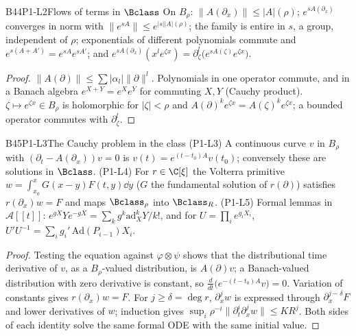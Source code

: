 \begin{dimcard}{B44}{P1-L2}{Flows of terms in $\Bclass$}{\proved}{}
On $B_\rho$: $\|A(\partial_x)\|\le|A|(\rho)$; $e^{sA(\partial_x)}$ converges in norm with $\|e^{sA}\|\le e^{|s||A|(\rho)}$; the family is entire in $s$, a group, independent of $\rho$; exponentials of different polynomials commute and $e^{s(A+A')}=e^{sA}e^{sA'}$; and $e^{sA(\partial_x)}(x^le^{\zeta x})=\partial_\zeta^l\big(e^{sA(\zeta)}e^{\zeta x}\big)$.
\end{dimcard}
\begin{proof}
$\|A(\partial)\|\le\sum|\alpha_l|\|\partial\|^l$. Polynomials in one operator commute, and in a Banach algebra $e^{X+Y}=e^Xe^Y$ for commuting $X,Y$ (Cauchy product).
$\zeta\mapsto e^{\zeta x}\in B_\rho$ is holomorphic for $|\zeta|<\rho$ and $A(\partial)^ke^{\zeta x}=A(\zeta)^ke^{\zeta x}$; a bounded operator commutes with $\partial_\zeta^l$.
\end{proof}

\begin{dimcard}{B45}{P1-L3}{The Cauchy problem in the class}{\proved}{}
\label{dim:P1-L4}\label{dim:P1-L5}%
(P1-L3) A continuous curve $v$ in $B_\rho$ with $(\partial_t-A(\partial_x))v=0$ is $v(t)=e^{(t-t_0)A}v(t_0)$; conversely these are solutions in $\Bclass$. (P1-L4) For $r\in\C[\xi]$ the Volterra primitive $w=\int_{x_0}^xG(x-y)F(t,y)\dd y$ ($G$ the fundamental solution of $r(\partial)$) satisfies $r(\partial_x)w=F$ and maps $\Bclass_\rho$ into $\Bclass_R$. (P1-L5) Formal lemmas in $\mathcal A[[t]]$: $e^{gX}Ye^{-gX}=\sum_kg^k\mathrm{ad}_X^kY/k!$, and for $U=\prod_ie^{g_iX_i}$, $U'U^{-1}=\sum_ig_i'\,\mathrm{Ad}(P_{i-1})X_i$.
\end{dimcard}
\begin{proof}
Testing the equation against $\varphi\otimes\psi$ shows that the distributional time derivative of $v$, as a $B_\rho$-valued distribution, is $A(\partial)v$; a Banach-valued distribution with zero derivative is constant, so $\frac{d}{dt}\big(e^{-(t-t_0)A}v\big)=0$.
Variation of constants gives $r(\partial_x)w=F$. For $j\ge\delta=\deg r$, $\partial_x^jw$ is expressed through $\partial_x^{j-\delta}F$ and lower derivatives of $w$; induction gives $\sup_i\rho^{-i}\|\partial_t^i\partial_x^jw\|\le KR^j$.
Both sides of each identity solve the same formal ODE with the same initial value.
\end{proof}

